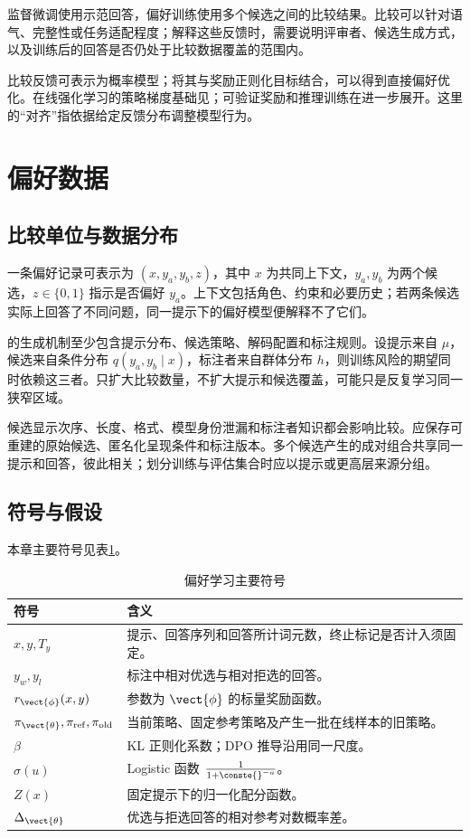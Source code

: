 \documentclass[../textbook.tex]{subfiles}
\begin{document}
\fi
{}

监督微调使用示范回答，偏好训练使用多个候选之间的比较结果。比较可以针对语气、完整性或任务适配程度；解释这些反馈时，需要说明评审者、候选生成方式，以及训练后的回答是否仍处于比较数据覆盖的范围内。

比较反馈可表示为概率模型；将其与奖励正则化目标结合，可以得到直接偏好优化。在线强化学习的策略梯度基础见；可验证奖励和推理训练在进一步展开。这里的“对齐”指依据给定反馈分布调整模型行为。

\section{偏好数据}

\subsection{比较单位与数据分布}
一条偏好记录可表示为 $(x,y_a,y_b,z)$，其中 $x$ 为共同上下文，$y_a,y_b$ 为两个候选，$z\in\{0,1\}$ 指示是否偏好 $y_a$。上下文包括角色、约束和必要历史；若两条候选实际上回答了不同问题，同一提示下的偏好模型便解释不了它们。

的生成机制至少包含提示分布、候选策略、解码配置和标注规则。设提示来自 $\mu$，候选来自条件分布 $q(y_a,y_b\mid x)$，标注者来自群体分布 $h$，则训练风险的期望同时依赖这三者。只扩大比较数量，不扩大提示和候选覆盖，可能只是反复学习同一狭窄区域。

候选显示次序、长度、格式、模型身份泄漏和标注者知识都会影响比较。应保存可重建的原始候选、匿名化呈现条件和标注版本。多个候选产生的成对组合共享同一提示和回答，彼此相关；划分训练与评估集合时应以提示或更高层来源分组。

\subsection{符号与假设}
本章主要符号见表\ref{tab:preference-alignment-symbols}。
\begin{table}[htbp]
\centering
\caption{偏好学习主要符号}
\label{tab:preference-alignment-symbols}
\begin{tabular}{ll}
\toprule
符号 & 含义\\
\midrule
$x,y,T_y$ & 提示、回答序列和回答所计词元数，终止标记是否计入须固定。\\
$y_w,y_l$ & 标注中相对优选与相对拒选的回答。\\
$r_{\vect{\phi}}(x,y)$ & 参数为 $\vect{\phi}$ 的标量奖励函数。\\
$\pi_{\vect{\theta}},\pi_{\mathrm{ref}},\pi_{\mathrm{old}}$ & 当前策略、固定参考策略及产生一批在线样本的旧策略。\\
$\beta$ & KL 正则化系数；DPO 推导沿用同一尺度。\\
$\sigma(u)$ & Logistic 函数 $\frac{1}{1+\conste{}^{-u}}$。\\
$Z(x)$ & 固定提示下的归一化配分函数。\\
$\Delta_{\vect{\theta}}$ & 优选与拒选回答的相对参考对数概率差。\\
\bottomrule
\end{tabular}
\end{table}
\end{document}
